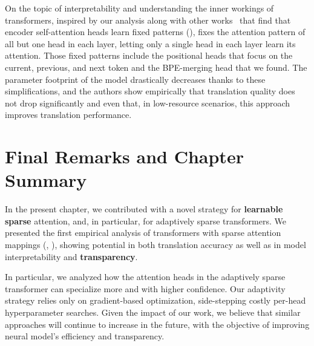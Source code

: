 On the topic of interpretability and understanding the inner workings
of transformers, inspired by our analysis along with other
works~\citep{voita2019AnalyzingMultiHeadSelfAttention} that find that
encoder self-attention heads learn fixed patterns
(), \citet{raganato2020FixedEncoderSelfAttentiona}
fixes the attention pattern of all but one head in each layer,
letting only a single head in each layer learn its attention. Those
fixed patterns include the positional heads that focus on the
current, previous, and next token and the BPE-merging head that we
found. The parameter footprint of the model drastically decreases
thanks to these simplifications, and the authors show empirically
that translation quality does not drop significantly and even that,
in low-resource scenarios, this approach improves translation
performance.

\section{Final Remarks and Chapter Summary}

In the present chapter, we contributed with a novel strategy for
\textbf{learnable sparse} attention, and, in particular, for adaptively
sparse transformers. We presented the first empirical analysis of
transformers with sparse attention mappings (\ie, \entmaxtext),
showing potential in both translation accuracy as well as in model
interpretability and \textbf{transparency}.

In particular, we analyzed how the attention heads in the adaptively
sparse transformer can specialize more and with higher confidence.
Our adaptivity strategy relies only on gradient-based optimization,
side-stepping costly per-head hyperparameter searches. Given the
impact of our work, we believe that similar approaches will continue
to increase in the future, with the objective of improving neural
model's efficiency and transparency.

\cleardoublepage

\singlespacing